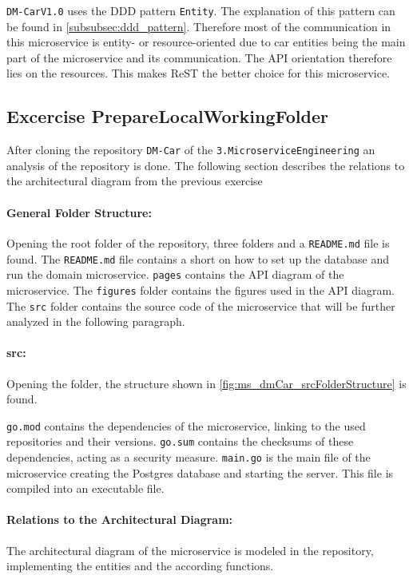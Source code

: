 \texttt{DM-CarV1.0} uses the DDD pattern \texttt{Entity}.
The explanation of this pattern can be found in \autoref{subsubsec:ddd_pattern}.
Therefore most of the communication in this microservice is entity- or resource-oriented due to car entities being the main part of the microservice and its communication.
The API orientation therefore lies on the resources.
This makes ReST the better choice for this microservice.

\subsection{Excercise PrepareLocalWorkingFolder}
\label{subsec:prepare_local_working_folder}
After cloning the repository \texttt{DM-Car} of the \texttt{3.MicroserviceEngineering} an analysis of the repository is done.
The following section describes the relations to the architectural diagram from the previous exercise 

\paragraph*{General Folder Structure:}
Opening the root folder of the repository, three folders and a \texttt{README.md} file is found.
The \texttt{README.md} file contains a short on how to set up the database and run the domain microservice.
\texttt{pages} contains the API diagram of the microservice.
The \texttt{figures} folder contains the figures used in the API diagram. 
The \texttt{src} folder contains the source code of the microservice that will be further analyzed in the following paragraph.

\paragraph*{src:}
Opening the folder, the structure shown in \autoref{fig:ms_dmCar_srcFolderStructure} is found.

\texttt{go.mod} contains the dependencies of the microservice, linking to the used repositories and their versions.
\texttt{go.sum} contains the checksums of these dependencies, acting as a security measure.
\texttt{main.go} is the main file of the microservice creating the Postgres database and starting the server.
This file is compiled into an executable file.

\paragraph*{Relations to the Architectural Diagram:}
The architectural diagram of the microservice is modeled in the repository, implementing the entities and the according functions.

